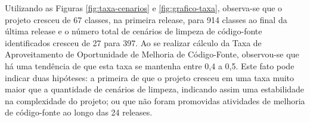 Utilizando as Figuras \ref{fig:taxa-cenarios} e \ref{fig:grafico-taxa}, observa-se que o projeto cresceu de 67 classes, na primeira release, para 914 classes ao final da última release e o número total de cenários de limpeza de código-fonte identificados cresceu de 27 para 397. Ao se realizar cálculo da Taxa de Aproveitamento de Oportunidade de Melhoria de Código-Fonte, observou-se que há uma tendência de que esta taxa se mantenha entre 0,4 a 0,5. Este fato pode indicar duas hipóteses: a primeira de que o projeto cresceu em uma taxa muito maior que a quantidade de cenários de limpeza, indicando assim uma estabilidade na complexidade do projeto; ou que não foram promovidas atividades de melhoria de código-fonte ao longo das 24 releases.  

